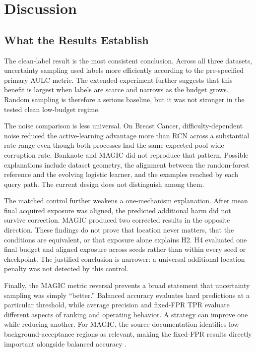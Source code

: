 \documentclass[11pt]{article}
\begin{document}
\section{Discussion}

\subsection{What the Results Establish}

The clean-label result is the most consistent conclusion. Across all three
datasets, uncertainty sampling used labels more efficiently according to the
pre-specified primary AULC metric. The extended experiment further suggests
that this benefit is largest when labels are scarce and narrows as the budget
grows. Random sampling is therefore a serious baseline, but it was not
stronger in the tested clean low-budget regime.

The noise comparison is less universal. On Breast Cancer,
difficulty-dependent noise reduced the active-learning advantage more than
RCN across a substantial rate range even though both processes had the same
expected pool-wide corruption rate. Banknote and MAGIC did not reproduce that
pattern. Possible explanations include dataset geometry, the alignment
between the random-forest reference and the evolving logistic learner, and
the examples reached by each query path. The current design does not
distinguish among them.

The matched control further weakens a one-mechanism explanation. After mean
final acquired exposure was aligned, the predicted additional harm did not
survive correction. MAGIC produced two corrected results in the opposite
direction. These findings do not prove that location never matters, that the
conditions are equivalent, or that exposure alone explains H2. H4 evaluated
one final budget and aligned exposure across seeds rather than within every
seed or checkpoint. The justified conclusion is narrower: a universal
additional location penalty was not detected by this control.

Finally, the MAGIC metric reversal prevents a broad statement that uncertainty
sampling was simply ``better.'' Balanced accuracy evaluates hard predictions
at a particular threshold, while average precision and fixed-FPR TPR evaluate
different aspects of ranking and operating behavior. A strategy can improve
one while reducing another. For MAGIC, the source documentation identifies
low background-acceptance regions as relevant, making the fixed-FPR results
directly important alongside balanced accuracy \citep{bock2004}.
\end{document}

